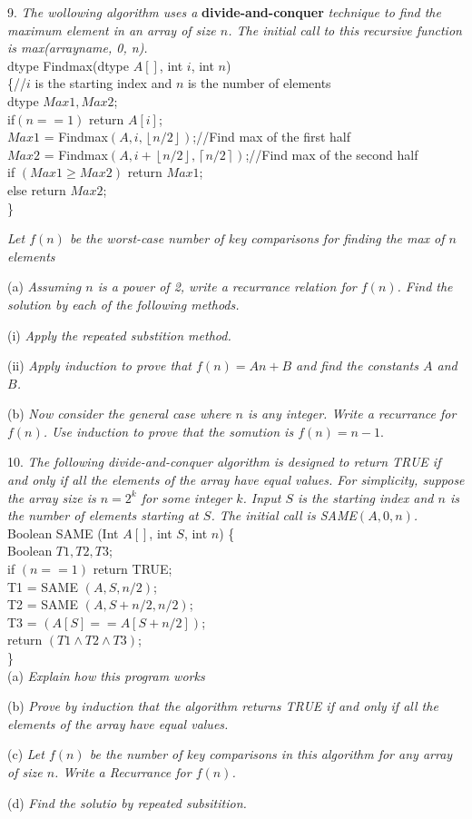 \documentclass[10pt]{article}
\newcommand\tab[1][.5cm]{\hspace*{#1}}
\begin{document}
9. \textit{The wollowing algorithm uses a} \textbf{divide-and-conquer} \textit{technique to find the maximum element in an array of size $n$.  The initial call to this recursive function is max(arrayname, 0, n).}\\
\tab dtype Findmax(dtype $A[]$, int $i$, int $n$)\\
\tab \{\tab //$i$ is the starting index and $n$ is the number of elements\\
\tab dtype $Max1,Max2$;\\
\tab if$(n==1)$ return $A[i]$;\\
\tab $Max1$ = Findmax$(A,i,\left \lfloor{n/2}\right \rfloor)$;\tab \tab \tab //Find max of the first half\\
\tab $Max2$ = Findmax$(A,i+\left \lfloor{n/2}\right \rfloor,\left \lceil{n/2}\right \rceil)$;\tab //Find max of the second half\\
\tab if $(Max1 \geq Max2)$ \tab return $Max1$;\\
\tab \tab else return $Max2$;\\
\tab \}

\textit{Let $f(n)$ be the worst-case number of key comparisons for finding the max of $n$ elements}

(a) \textit{Assuming $n$ is a power of 2, write a recurrance relation for $f(n)$.  Find the solution by each of the following methods.}

\tab (i) \textit{Apply the repeated substition method.}

\tab (ii) \textit{Apply induction to prove that $f(n)=An+B$ and find the constants $A$ and $B$.}

(b) \textit{Now consider the general case where $n$ is any integer.  Write a recurrance for $f(n)$.  Use induction to prove that the somution is $f(n)=n-1$}.

10. \textit{The following divide-and-conquer algorithm is designed to return TRUE if and only if all the elements of the array have equal values.  For simplicity, suppose the array size is $n=2^k$ for some integer $k$.  Input $S$ is the starting index and $n$ is the number of elements starting at $S$.  The initial call is SAME$(A,0,n)$.}\\
\tab Boolean SAME (Int $A[]$, int $S$, int $n$) \{\\
\tab Boolean $T1,T2,T3$;\\
\tab if $(n==1)$ return TRUE;\\
\tab T1 = SAME $(A,S,n/2)$;\\
\tab T2 = SAME $(A,S+n/2,n/2)$;\\
\tab T3 = $(A[S] == A[S+n/2])$;\\
\tab return $(T1 \wedge T2 \wedge T3)$;\\
\tab \}\\
(a) \textit{Explain how this program works}

(b) \textit{Prove by induction that the algorithm returns TRUE if and only if all the elements of the array have equal values.}

(c) \textit{Let $f(n)$ be the number of key comparisons in this algorithm for any array of size $n$.  Write a Recurrance for $f(n)$.}

(d) \textit{Find the solutio by repeated subsitition.}
\end{document}
